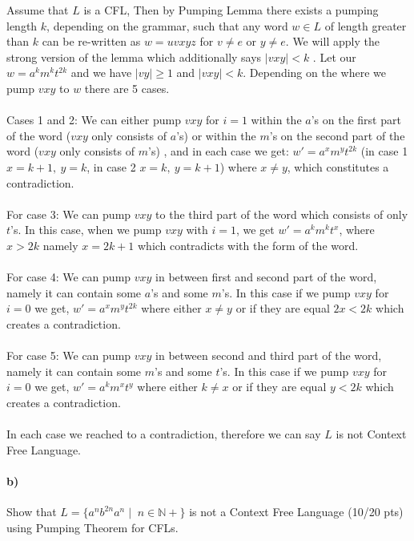 \documentclass[a4paper,12pt]{article}
\begin{document}
\begin{tcolorbox}
Assume that $L$ is a CFL, Then by Pumping Lemma there exists a pumping length $k$, depending on the grammar, such that any word $w \in L$ of length greater than $k$ can be re-written as $w=uvxyz$ for $v \neq e$ or $y \neq e$. We will apply the strong version of the lemma which additionally says $|vxy|<k$ . Let our $w=a^km^kt^{2k}$ and we have $|vy|\geq 1$ and $|vxy| < k$. Depending on the where we pump $vxy$ to $w$ there are 5 cases.\\\\
Cases 1 and 2: We can either pump $vxy$ for $i=1$ within the $a$'s on the first part of the word ($vxy$ only consists of $a$'s) or within the $m$'s on the second part of the word ($vxy$ only consists of $m$'s) , and in each case we get: $w'=a^xm^yt^{2k}$ (in case 1 $x=k+1 ,\ y=k$, in case 2 $x=k ,\ y=k+1$) where $x\neq y$, which constitutes a contradiction.\\\\
For case 3: We can pump $vxy$ to the third part of the word which consists of only $t$'s. In this case, when we pump $vxy$ with $i=1$, we get $w'=a^km^kt^x$, where $x > 2k$ namely $x = 2k + 1$ which contradicts with the form of the word.\\\\
For case 4: We can pump $vxy$ in between first and second part of the word, namely it can contain some $a$'s and some $m$'s. In this case if we pump $vxy$ for $i=0$ we get, $w'=a^xm^yt^{2k}$ where either $x\neq y$ or if they are equal $2x < 2k$ which creates a contradiction.\\\\
For case 5: We can pump $vxy$ in between second and third part of the word, namely it can contain some $m$'s and some $t$'s. In this case if we pump $vxy$ for $i=0$ we get, $w'=a^km^xt^y$ where either $k\neq x$ or if they are equal $y < 2k$ which creates a contradiction.\\\\

In each case we reached to a contradiction, therefore we can say $L$ is not Context Free Language.
\end{tcolorbox}

\newpage

\paragraph{b)} Show that $L=\{a^n b^{2n} a^n \mid \; n \in \mathbb{N+} \}$ is not a Context Free Language \hfill \small{(10/20 pts)} \\
using Pumping Theorem for CFLs. \\
\end{document}
